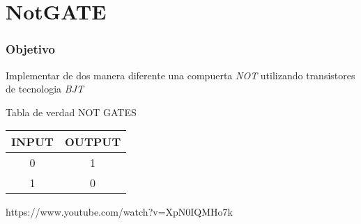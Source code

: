 \chapter{NotGATE}
\subsection{Objetivo}
Implementar de dos manera diferente una compuerta \emph{NOT} utilizando transistores de tecnologia \emph{BJT}

\begin{center}
Tabla de verdad NOT GATES
	\begin{center}
		\begin{tabular}{|c|c|}
					\hline
					\textbf{INPUT} & \textbf{OUTPUT} \\
					\hline
					0  &  1\\
					\hline
					1  & 0\\
					\hline
				\end{tabular}
	\end{center}
\end{center}
			
			
https://www.youtube.com/watch?v=XpN0IQMHo7k